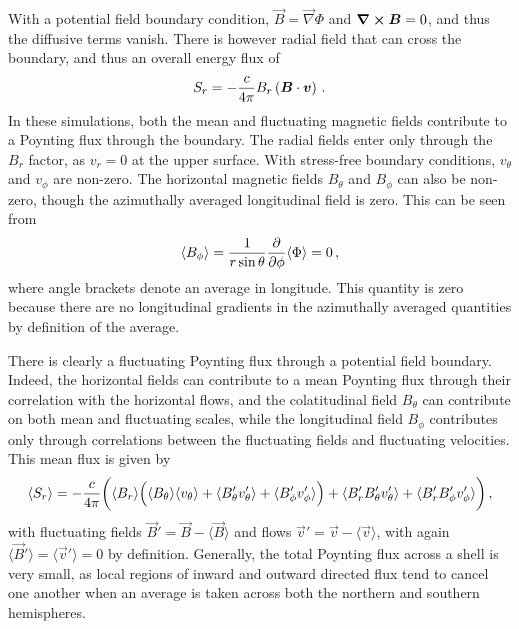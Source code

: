 With a potential field boundary condition, $\vec{B} = \vec{\nabla}
\Phi$ and $\vec{\nabla} \cross \vec{B}=0$, and thus the diffusive terms
vanish.  There is however radial field that can cross the boundary,
and thus an overall energy flux of
\begin{equation}
   S_r =  - \frac{c}{4 \pi} B_r \left(\vec{B} \cdot \vec{v}\right)\thinspace.
\end{equation}
In these simulations, both the mean and fluctuating magnetic fields
contribute to a Poynting flux through the boundary.  The radial fields
enter only through the $B_r$ factor, as $v_r =0$ at the upper surface.
With stress-free boundary conditions, $v_\theta$ and $v_\phi$ are
non-zero.  The horizontal magnetic fields $B_\theta$ and $B_\phi$ can
also be non-zero, though the azimuthally averaged longitudinal field
is zero.  This can be seen from
\begin{equation}
  \langle B_\phi \rangle = \frac{1}{r \sin\theta}\frac{\partial}{\partial \phi} \langle \Phi \rangle =0\thinspace,
\end{equation} 
where angle brackets denote an average in longitude.  This quantity is
zero because there are no longitudinal gradients in the azimuthally
averaged quantities by definition of the average.

There is clearly a fluctuating Poynting flux through a potential field
boundary.  Indeed, the horizontal fields can contribute to a mean
Poynting flux through their correlation with the horizontal flows, and
the colatitudinal  field $B_\theta$ can contribute on both mean and
fluctuating scales, while the longitudinal field
$B_\phi$ contributes only through correlations between the
fluctuating fields and fluctuating velocities.  This mean flux is
given by
\begin{equation}
   \langle S_r \rangle =  
- \frac{c}{4 \pi} 
   \bigg(
   \langle B_r \rangle \Big(
   \langle B_\theta \rangle \langle v_\theta \rangle + 
   \langle B_\theta' v_\theta' \rangle + 
   \langle B_\phi' v_\phi' \rangle \Big)
   +\langle B_r' B_\theta' v_\theta' \rangle + 
   \langle  B_r' B_\phi' v_\phi' \rangle 
   \bigg)\thinspace,
\end{equation}
with fluctuating fields $\vec{B}' = \vec{B} - \langle
\vec{B} \rangle$ and flows $\vec{v}' = \vec{v} - \langle
\vec{v} \rangle$, with again $\langle \vec{B}' \rangle = \langle \vec{v}'
\rangle = 0$ by definition.  Generally, the total Poynting flux across
a shell is very small, as local regions of inward and outward directed
flux tend to cancel one another when an average is taken across both
the northern and southern hemispheres.

